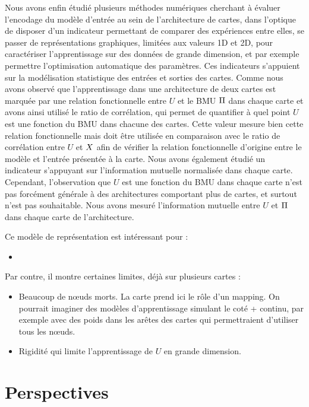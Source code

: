 Nous avons enfin étudié plusieurs méthodes numériques cherchant à évaluer l'encodage du modèle d'entrée au sein de l'architecture de cartes, dans l'optique de disposer d'un indicateur permettant de comparer des expériences entre elles, se passer de représentations graphiques, limitées aux valeurs 1D et 2D, pour caractériser l'apprentissage sur des données de grande dimension, et par exemple permettre l'optimisation automatique des paramètres. Ces indicateurs s'appuient sur la modélisation statistique des entrées et sorties des cartes.
Comme nous avons observé que l'apprentissage dans une architecture de deux cartes est marquée par une relation fonctionnelle entre $U$ et le BMU $\Pi$ dans chaque carte et avons ainsi utilisé le ratio de corrélation, qui permet de quantifier à quel point $U$ est une fonction du BMU dans chacune des cartes.
Cette valeur mesure bien cette relation fonctionnelle mais doit être utilisée en comparaison avec le ratio de corrélation entre $U$ et $X$ afin de vérifier la relation fonctionnelle d'origine entre le modèle et l'entrée présentée à la carte.
Nous avons également étudié un indicateur s'appuyant sur l'information mutuelle normalisée dans chaque carte. Cependant, l'observation que $U$ est une fonction du BMU dans chaque carte n'est pas forcément générale à des architectures comportant plus de cartes, et surtout n'est pas souhaitable.
Nous avons mesuré l'information mutuelle entre $U$ et $\Pi$ dans chaque carte de l'architecture.

Ce modèle de représentation est intéressant pour :
\begin{itemize}
    \item 
\end{itemize}

Par contre, il montre certaines limites, déjà sur plusieurs cartes : 
\begin{itemize}
    \item Beaucoup de n\oe{}uds morts. La carte prend ici le rôle d'un mapping. On pourrait imaginer des modèles d'apprentissage simulant le coté + continu, par exemple avec des poids dans les arêtes des cartes qui permettraient d'utiliser tous les n\oe{}uds.
    \item Rigidité qui limite l'apprentissage de $U$ en grande dimension.
\end{itemize}



\section*{Perspectives}

